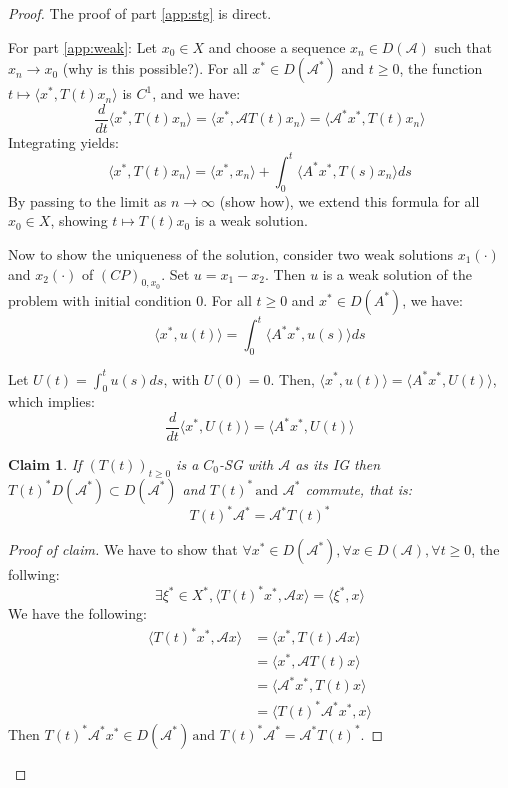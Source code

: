\documentclass[12pt, oneside]{book}
\newtheorem{claim}{Claim}[section]
\newcommand{\A}{\mathscr{A}}
\begin{document}
\begin{proof} The proof of part \ref{app:stg} is direct.

\bigskip

For part \ref{app:weak}: Let $x_0 \in X$ and choose a sequence $x_n \in D(\A)$ such that $x_n \rightarrow x_0$ (why is this possible?). For all $x^* \in D(\A^*)$ and $t \ge 0$, the function $t \mapsto \langle x^*, T(t)x_n \rangle$ is $C^1$, and we have:
$$
\frac{d}{dt} \langle x^*, T(t)x_n \rangle = \langle x^*, \A T(t)x_n \rangle = \langle \A^* x^*, T(t)x_n \rangle
$$
Integrating yields:
$$ \langle x^*, T(t)x_n \rangle = \langle x^*, x_n \rangle + \int_0^t \langle A^* x^*, T(s)x_n \rangle ds $$ 
By passing to the limit as $n \rightarrow \infty$ (show how), we extend this formula for all $x_0 \in X$, showing $t \mapsto T(t)x_0$ is a weak solution. 

\bigskip

Now to show the uniqueness of the solution, consider two weak solutions $x_1(\cdot)$ and $x_2(\cdot)$ of $(CP)_{0,x_0}$. 
Set $u = x_1 - x_2$. 
Then $u$ is a weak solution of the problem with initial condition $0$. 
For all $t \ge 0$ and $x^* \in D(A^*)$, we have:
$$
\langle x^*, u(t) \rangle = \int_0^t \langle A^* x^*, u(s) \rangle ds
$$

Let $U(t) = \int_0^t u(s)ds$, with $U(0) = 0$. 
Then, $\langle x^*, u(t) \rangle = \langle A^* x^*, U(t) \rangle$, which implies:
\begin{equation}\label{sol:weak:uniq}
\frac{d}{dt} \langle x^*, U(t) \rangle = \langle A^* x^*, U(t) \rangle \tag{***}
\end{equation}

\begin{claim}
	If $\left( T(t) \right)_{t \ge 0}$ is a $C_0$-SG with $\A$ as its IG then $T(t)^* D(\A^*) \subset D(\A^*)$ and $T(t)^*\, \text{and } \A^*$ commute, that is:
	$$
		T(t)^* \A^* = \A^* T(t)^*
	$$
\end{claim}

\begin{proof}[Proof of claim]
We have to show that $\forall{x^*} \in D(\A^*), \forall{x} \in D(\A), \forall{t} \ge 0$, the follwing:
$$
\exists{\xi^*} \in X^*, \langle T(t)^* x^*, \A x \rangle = \langle \xi^*, x \rangle 
$$
We have the following:
\begin{align*}
	\langle T(t)^* x^*, \A x \rangle 
	&= \langle x^*, T(t) \A x \rangle \\
	&= \langle x^*, \A T(t) x \rangle \\
	&= \langle \A^* x^*, T(t) x \rangle \\
	&= \langle T(t)^* \A^* x^*, x \rangle
\end{align*}
Then $T(t)^* \A^* x^* \in D(\A^*)\, \text{and } T(t)^* \A^* = \A^* T(t)^*$.
\end{proof}


\end{proof}
\end{document}
